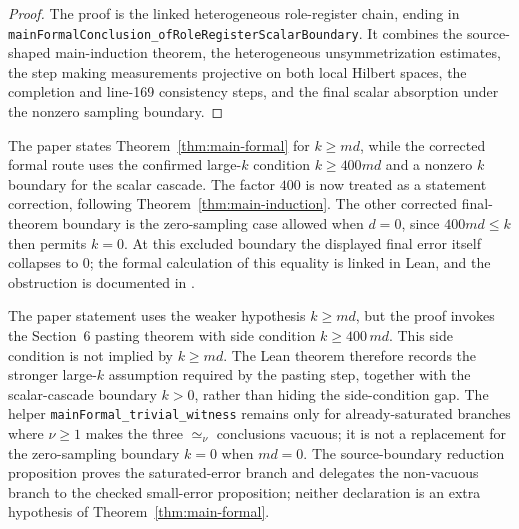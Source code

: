 \begin{proof}
	\leanok
	The proof is the linked heterogeneous role-register chain, ending in
	\texttt{mainFormalConclusion\_ofRoleRegisterScalarBoundary}.  It
	combines the source-shaped main-induction theorem, the heterogeneous
	unsymmetrization estimates, the step making measurements projective on both
	local Hilbert spaces, the completion and line-169 consistency steps, and the
	final scalar absorption under the nonzero sampling boundary.
\end{proof}

\begin{remark}\label{rem:main-formal-source-k-range-boundary}
	The paper states Theorem~\ref{thm:main-formal} for \(k\ge md\), while the
	corrected formal route uses the confirmed large-\(k\) condition
	\(k\ge 400md\) and a nonzero \(k\) boundary for the scalar cascade.  The
	factor \(400\) is now treated as a statement correction, following
	Theorem~\ref{thm:main-induction}.  The other corrected final-theorem boundary is
	the zero-sampling case allowed when \(d=0\), since \(400md\le k\) then permits
	\(k=0\).  At this excluded boundary the displayed final error itself collapses to \(0\);
	the formal calculation of this equality is linked in Lean, and the
	obstruction is documented in \cite{gap:issue-422-main-formal-zero-k-boundary}.
\end{remark}

\begin{remark}\label{rem:main-formal-k-boundary}
	The paper statement uses the weaker hypothesis $k \ge md$, but the proof
	invokes the Section~6 pasting theorem with side condition $k \ge 400\,md$.
	This side condition is not implied by $k \ge md$.  The Lean theorem
	therefore records the stronger large-$k$ assumption required by the pasting
	step, together with the scalar-cascade boundary \(k>0\), rather than hiding
	the side-condition gap.  The helper
	\texttt{mainFormal\_trivial\_witness} remains only for already-saturated
	branches where $\nu \ge 1$ makes the three $\simeq_\nu$ conclusions vacuous;
	it is not a replacement for the zero-sampling boundary \(k=0\) when \(md=0\).
	The source-boundary reduction proposition proves the saturated-error branch
	and delegates the non-vacuous branch to the checked small-error proposition;
	neither declaration is an extra hypothesis of Theorem~\ref{thm:main-formal}.
\end{remark}
